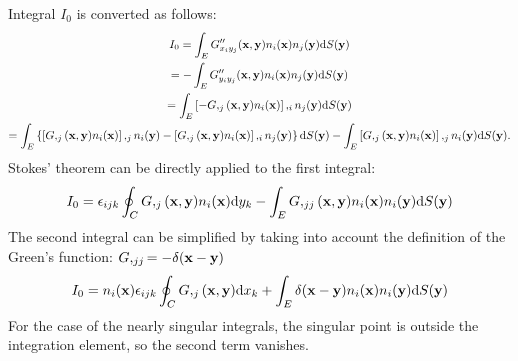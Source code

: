 Integral $I_0$ is converted as follows:
%
\begin{multline}
	I_0
	= \int_E G''_{x_i y_j}({\bf x}, {\bf y}) n_i({\bf x}) n_j({\bf y}) \mathrm{d} S({\bf y}) \\
	= -\int_E G''_{y_i y_j}({\bf x}, {\bf y}) n_i({\bf x}) n_j({\bf y}) \mathrm{d} S({\bf y}) \\
	= \int_E \left[ -G,_j({\bf x}, {\bf y}) n_i({\bf x}) \right],_{i} n_j({\bf y}) \mathrm{d} S({\bf y}) \\
	= \int_E \left\{
		\left[G,_j({\bf x}, {\bf y}) n_i({\bf x}) \right],_{j} n_i({\bf y})
		-\left[G,_j({\bf x}, {\bf y}) n_i({\bf x}) \right],_{i} n_j({\bf y})
	\right\} \mathrm{d} S({\bf y})
	- \int_E \left[G,_j({\bf x}, {\bf y}) n_i({\bf x}) \right],_{j} n_i({\bf y}) \mathrm{d} S({\bf y}).
\end{multline}
%
Stokes' theorem can be directly applied to the first integral:
%
\begin{equation}
	I_0 = \epsilon_{ijk} \oint_C G,_j({\bf x}, {\bf y}) n_i({\bf x}) \mathrm{d} y_k
	- \int_E G,_{jj}({\bf x}, {\bf y}) n_i({\bf x}) n_i({\bf y}) \mathrm{d} S({\bf y})
\end{equation}
%
The second integral can be simplified by taking into account the definition of the Green's function: $G,_{jj} = -\delta({\bf x} - {\bf y})$
%
\begin{equation}
	I_0 = n_i({\bf x}) \epsilon_{ijk} \oint_C G,_j({\bf x}, {\bf y}) \mathrm{d} x_k
	+ \int_E \delta({\bf x} - {\bf y}) n_i({\bf x}) n_i({\bf y}) \mathrm{d} S({\bf y})
\end{equation}
%
For the case of the nearly singular integrals, the singular point is outside the integration element, so the second term vanishes.

